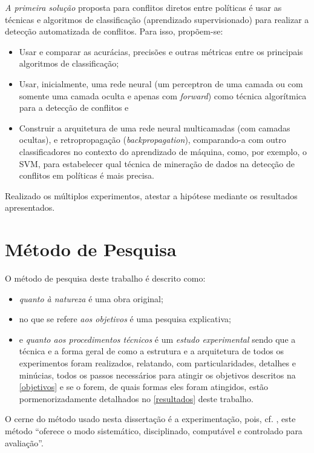 \documentclass[
	12pt,				%
	openright,			%
	oneside,			%
	a4paper,			%
	english,			%
	french,				%
	spanish,			%
	brazil				%
	]{abntex2}
\begin{document}
\textit{A primeira solução} proposta para conflitos diretos entre políticas é usar as técnicas e algoritmos de classificação (aprendizado supervisionado) para  realizar a detecção automatizada de conflitos. Para isso, propõem-se:
\begin{itemize}
	\item Usar e comparar as acurácias, precisões e outras métricas entre os principais algoritmos de classificação;
	\item Usar, inicialmente, uma rede neural (um perceptron de uma camada ou com somente uma camada oculta e apenas com \textit{forward}) como técnica algorítmica para a detecção de conflitos e
	\item Construir a arquitetura de uma rede neural multicamadas (com camadas ocultas), e retropropagação (\textit{backpropagation}), comparando-a com outro classificadores no contexto do aprendizado de máquina, como, por exemplo, o SVM, para estabelecer qual técnica de mineração de dados na detecção de conflitos em políticas é mais precisa.	
\end{itemize}
Realizado os múltiplos experimentos, atestar a hipótese mediante os resultados apresentados.

\section{Método de Pesquisa}\label{metodo-pesquisa} %
O método de pesquisa deste trabalho é descrito como:
 \begin{itemize}
 	\item \textit{quanto à natureza} é uma obra original;
 	\item no que se refere \textit{aos objetivos} é uma pesquisa explicativa;
 	\item e \textit{quanto aos procedimentos técnicos} é um \textit{estudo experimental} sendo que a técnica e a forma geral de como a estrutura e a arquitetura de todos os experimentos foram realizados, relatando, com particularidades, detalhes e minúcias, todos os passos necessários para atingir os objetivos descritos na \autoref{objetivos} e se o forem, de quais formas eles foram atingidos, estão pormenorizadamente detalhados no \autoref{resultados} deste trabalho.
 \end{itemize}
O cerne do método usado nesta dissertação é a experimentação, pois, cf. , este método ``oferece o modo sistemático, disciplinado, computável e controlado para avaliação''. 
\end{document}
